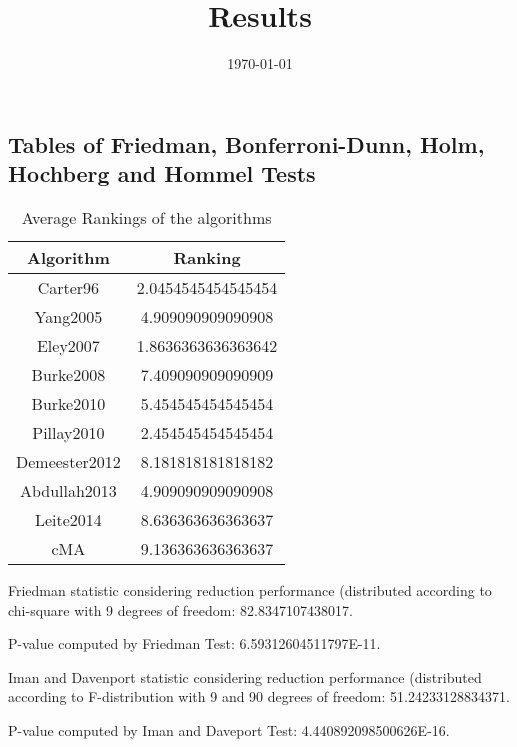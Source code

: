 \documentclass[a4paper,10pt]{article}
\title{Results}
\author{}
\date{\today}
\begin{document}
\begin{landscape}
\oddsidemargin 0in \topmargin 0in\maketitle
\section{Tables of Friedman, Bonferroni-Dunn, Holm, Hochberg and Hommel Tests}
\begin{table}[!htp]
\centering
\caption{Average Rankings of the algorithms
}\begin{tabular}{c|c}
Algorithm&Ranking\\
\hline
Carter96&2.0454545454545454\\
Yang2005&4.909090909090908\\
Eley2007&1.8636363636363642\\
Burke2008&7.409090909090909\\
Burke2010&5.454545454545454\\
Pillay2010&2.454545454545454\\
Demeester2012&8.181818181818182\\
Abdullah2013&4.909090909090908\\
Leite2014&8.636363636363637\\
cMA&9.136363636363637\\
\end{tabular}
\end{table}


Friedman statistic considering reduction performance (distributed according to chi-square with 9 degrees of freedom: 82.8347107438017.


P-value computed by Friedman Test: 6.59312604511797E-11.\newline

Iman and Davenport statistic considering reduction performance (distributed according to F-distribution with 9 and 90 degrees of freedom: 51.24233128834371.


P-value computed by Iman and Daveport Test: 4.440892098500626E-16.\newline


\end{landscape}
\end{document}

